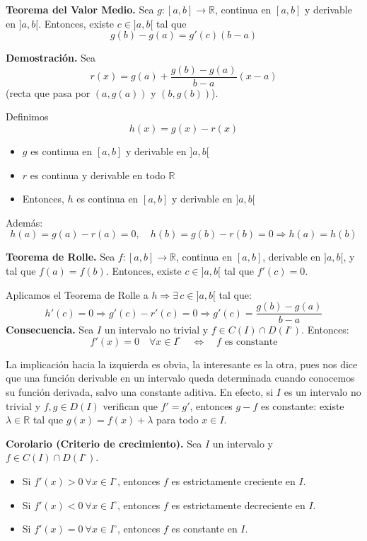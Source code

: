 \documentclass[12pt]{article}
\begin{document}
\setcounter{ejercicio}{0}
\begin{ejercicio}
\textbf{Teorema del Valor Medio.} Sea \( g: [a, b] \to \mathbb{R} \), continua en \( [a, b] \) y derivable en \( ]a, b[ \).  
Entonces, existe \( c \in ]a, b[ \) tal que
\[
g(b) - g(a) = g'(c)(b - a)
\]

\medskip
\textbf{Demostración.} Sea 
\[
r(x) = g(a) + \frac{g(b) - g(a)}{b - a}(x - a)
\]
(recta que pasa por \( (a, g(a)) \) y \( (b, g(b)) \)).

Definimos
\[
h(x) = g(x) - r(x)
\]
\begin{itemize}
    \item \( g \) es continua en \( [a, b] \) y derivable en \( ]a, b[ \)
    \item \( r \) es continua y derivable en todo \( \mathbb{R} \)
    \item Entonces, \( h \) es continua en \( [a, b] \) y derivable en \( ]a, b[ \)
\end{itemize}

Además:
\[
h(a) = g(a) - r(a) = 0, \quad h(b) = g(b) - r(b) = 0 \Rightarrow h(a) = h(b)
\]

\textbf{Teorema de Rolle.} Sea \( f: [a, b] \to \mathbb{R} \), continua en \( [a, b] \), derivable en \( ]a, b[ \), y tal que \( f(a) = f(b) \).  
Entonces, existe \( c \in ]a, b[ \) tal que \( f'(c) = 0 \).

Aplicamos el Teorema de Rolle a \( h \Rightarrow \exists\, c \in ]a, b[ \) tal que:
\[
h'(c) = 0 \Rightarrow g'(c) - r'(c) = 0 \Rightarrow g'(c) = \frac{g(b) - g(a)}{b - a}
\]
\textbf{Consecuencia.} Sea \( I \) un intervalo no trivial y \( f \in C(I) \cap D(I^\circ) \). Entonces:
\[
f'(x) = 0 \quad \forall x \in I^\circ \quad \Longleftrightarrow \quad f \text{ es constante}
\]

La implicación hacia la izquierda es obvia, la interesante es la otra, pues nos dice que una función derivable en un intervalo queda determinada cuando conocemos su función derivada, salvo una constante aditiva. En efecto, si \( I \) es un intervalo no trivial y \( f, g \in D(I) \) verifican que \( f' = g' \), entonces \( g - f \) es constante: existe \( \lambda \in \mathbb{R} \) tal que \( g(x) = f(x) + \lambda \) para todo \( x \in I \).

\medskip

\textbf{Corolario (Criterio de crecimiento).} Sea \( I \) un intervalo y \( f \in C(I) \cap D(I^\circ) \).

\begin{itemize}
    \item Si \( f'(x) > 0 \ \forall x \in I^\circ \), entonces \( f \) es estrictamente creciente en \( I \).
    \item Si \( f'(x) < 0 \ \forall x \in I^\circ \), entonces \( f \) es estrictamente decreciente en \( I \).
    \item Si \( f'(x) = 0 \ \forall x \in I^\circ \), entonces \( f \) es constante en \( I \).
\end{itemize}
    
\end{ejercicio}
\end{document}
